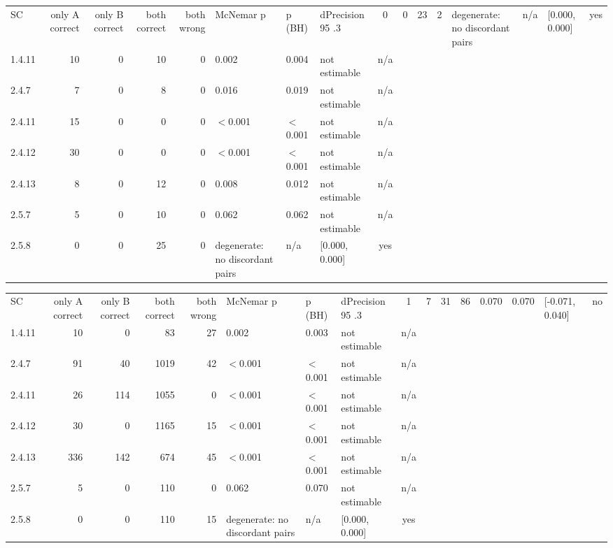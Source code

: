 \begin{tabular}{lrrrrlllc}
\hline
SC & only A correct & only B correct & both correct & both wrong & McNemar p & p (BH) & dPrecision 95%
.3 & 0 & 0 & 23 & 2 & degenerate: no discordant pairs & n/a & [0.000, 0.000] & yes \\
1.4.11 & 10 & 0 & 10 & 0 & 0.002 & 0.004 & not estimable & n/a \\
2.4.7 & 7 & 0 & 8 & 0 & 0.016 & 0.019 & not estimable & n/a \\
2.4.11 & 15 & 0 & 0 & 0 & $<$0.001 & $<$0.001 & not estimable & n/a \\
2.4.12 & 30 & 0 & 0 & 0 & $<$0.001 & $<$0.001 & not estimable & n/a \\
2.4.13 & 8 & 0 & 12 & 0 & 0.008 & 0.012 & not estimable & n/a \\
2.5.7 & 5 & 0 & 10 & 0 & 0.062 & 0.062 & not estimable & n/a \\
2.5.8 & 0 & 0 & 25 & 0 & degenerate: no discordant pairs & n/a & [0.000, 0.000] & yes \\
\hline
\end{tabular}

\begin{tabular}{lrrrrlllc}
\hline
SC & only A correct & only B correct & both correct & both wrong & McNemar p & p (BH) & dPrecision 95%
.3 & 1 & 7 & 31 & 86 & 0.070 & 0.070 & [-0.071, 0.040] & no \\
1.4.11 & 10 & 0 & 83 & 27 & 0.002 & 0.003 & not estimable & n/a \\
2.4.7 & 91 & 40 & 1019 & 42 & $<$0.001 & $<$0.001 & not estimable & n/a \\
2.4.11 & 26 & 114 & 1055 & 0 & $<$0.001 & $<$0.001 & not estimable & n/a \\
2.4.12 & 30 & 0 & 1165 & 15 & $<$0.001 & $<$0.001 & not estimable & n/a \\
2.4.13 & 336 & 142 & 674 & 45 & $<$0.001 & $<$0.001 & not estimable & n/a \\
2.5.7 & 5 & 0 & 110 & 0 & 0.062 & 0.070 & not estimable & n/a \\
2.5.8 & 0 & 0 & 110 & 15 & degenerate: no discordant pairs & n/a & [0.000, 0.000] & yes \\
\hline
\end{tabular}

